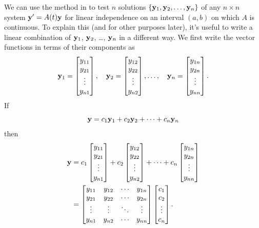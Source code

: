 We can use the method in
  to test
$n$ solutions $\{\mathbf{y}_1,\mathbf{y}_2,\dots,\mathbf{y}_n\}$ of any
$n\times n$ system
$\mathbf{y}'=A(t)\mathbf{y}$  for linear independence on an interval $(a,b)$
on which $A$ is continuous.  To explain this (and for other purposes
later), it's useful to write a linear combination of
$\mathbf{y}_1$, $\mathbf{y}_2$, \dots, $\mathbf{y}_n$ in a different way. We first
write the vector functions in terms of their components as
\[
\mathbf{y}_1
=\begin{bmatrix} y_{11}\\y_{21}\\ \vdots\\y_{n1}\end{bmatrix},\quad
\mathbf{y}_2
=\begin{bmatrix} y_{12}\\y_{22}\\ \vdots\\y_{n2}\end{bmatrix},\dots,\quad
\mathbf{y}_n=\begin{bmatrix} y_{1n}\\y_{2n}\\ \vdots\\ y_{nn}\end{bmatrix}.
\]
If
\[
\mathbf{y}=c_1\mathbf{y}_1+c_2\mathbf{y}_2+\cdots+c_n\mathbf{y}_n
\]
then
\begin{align*}
\mathbf{y}
&=c_1\begin{bmatrix} y_{11}\\y_{21}\\ \vdots\\y_{n1}\end{bmatrix}
+c_2\begin{bmatrix} y_{12}\\y_{22}\\ \vdots\\y_{n2}\end{bmatrix}+\cdots
+c_n\begin{bmatrix} y_{1n}\\y_{2n}\\ \vdots\\y_{nn}\end{bmatrix}\\
&=\begin{bmatrix}
y_{11}&y_{12}&\cdots&y_{1n} \\
y_{21}&y_{22}&\cdots&y_{2n}\\
\vdots&\vdots&\ddots&\vdots \\
y_{n1}&y_{n2}&\cdots&y_{nn} \\
\end{bmatrix}\begin{bmatrix}c_1\\c_2\\\vdots\\c_n\end{bmatrix}.
\end{align*}
